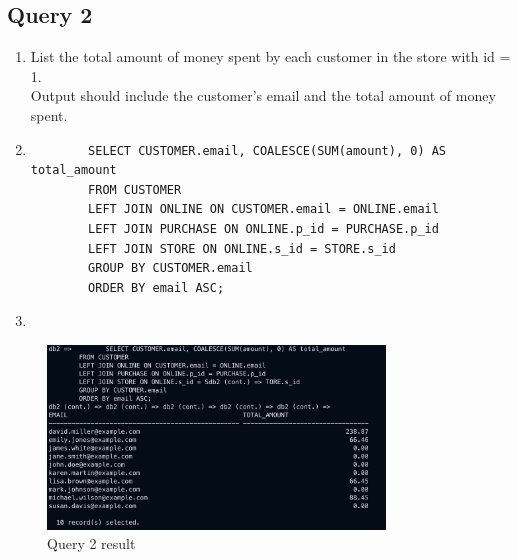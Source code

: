\documentclass[a4paper,11pt]{article}
\begin{document}
\subsection*{Query 2}
\begin{enumerate}[label=(\alph*)]
    \item List the total amount of money spent by each customer in the store with id = 1.\\
        Output should include the customer's email and the total amount of money spent.
    \item
        \begin{lstlisting}
        SELECT CUSTOMER.email, COALESCE(SUM(amount), 0) AS total_amount
        FROM CUSTOMER
        LEFT JOIN ONLINE ON CUSTOMER.email = ONLINE.email
        LEFT JOIN PURCHASE ON ONLINE.p_id = PURCHASE.p_id
        LEFT JOIN STORE ON ONLINE.s_id = STORE.s_id
        GROUP BY CUSTOMER.email
        ORDER BY email ASC;
        \end{lstlisting}
    \item
\end{enumerate}
\begin{figure}[H]
    \centering
    \includegraphics[width=0.8\textwidth]{Query2.png}
    \caption{Query 2 result}
\end{figure}
\end{document}
